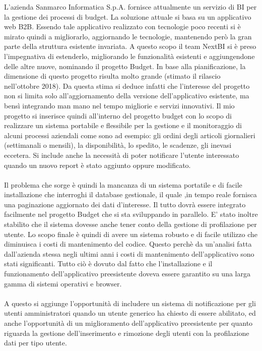 L'azienda Sanmarco Informatica S.p.A. fornisce attualmente un servizio di BI per la gestione dei processi di budget. La soluzione attuale si basa su un applicativo web B2B. Essendo tale applicativo realizzato con tecnologie poco recenti si è mirato quindi a migliorarlo, aggiornando le tecnologie, mantenendo però la gran parte della struttura esistente invariata.  A questo scopo il team NextBI si è preso l'impegnativa di estenderlo, migliorando le funzionalità esistenti e aggiungendone delle altre nuove, nominando il progetto Budget. In base alla pianificazione, la dimensione di questo progetto risulta molto grande (stimato il rilascio nell'ottobre 2018). Da questa stima si deduce infatti che l'interesse del progetto non si limita solo all'aggiornamento della versione dell'applicativo esistente, ma bensì integrando man mano nel tempo migliorie e servizi innovativi. Il mio progetto si inserisce quindi all'interno del progetto budget con lo scopo di realizzare un sistema portabile e flessibile per la gestione e il monitoraggio di alcuni processi aziendali come sono ad esempio: gli ordini degli articoli giornalieri (settimanali o mensili), la disponibilità, lo spedito, le scadenze, gli inevasi eccetera. Si include anche la necessità di poter notificare l'utente interessato quando un nuovo report è stato aggiunto oppure modificato. 
\\ \\
Il problema che sorge è quindi la mancanza di un sistema portatile e di facile installazione che interroghi il database gestionale, il quale ,in tempo reale fornisca una paginazione aggiornato dei dati d'interesse. Il tutto dovrà essere integrato facilmente nel progetto Budget che si sta sviluppando in parallelo. E' stato inoltre stabilito che il sistema dovesse anche tener conto della gestione di profilazione per utente. Lo scopo finale è quindi di avere un sistema robusto e di facile utilizzo che diminuisca i costi di mantenimento del codice. Questo perchè da un'analisi fatta dall'azienda stessa negli ultimi anni i costi di mantenimento dell'applicativo sono  stati significanti. Tutto ciò è dovuto dal fatto che l'installazione e il funzionamento dell'applicativo preesistente doveva essere garantito su una larga gamma di sistemi operativi e browser.
\\ \\
A questo si aggiunge l'opportunità di includere un sistema di notificazione per gli utenti amministratori quando un utente generico ha chiesto di essere abilitato, ed anche l'opportunità di un miglioramento dell'applicativo preesistente per quanto riguarda  la gestione dell'inserimento e rimozione degli utenti con la profilazione dati per tipo utente.






